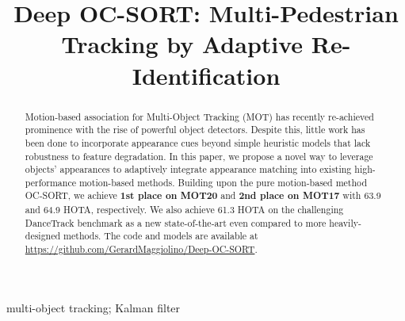 \documentclass{article}
\title{Deep OC-SORT: Multi-Pedestrian Tracking by Adaptive Re-Identification}
\begin{document}
\maketitle



\begin{abstract}
Motion-based association for Multi-Object Tracking (MOT) has recently re-achieved prominence with the rise of powerful object detectors. Despite this, little work has been done to incorporate appearance cues beyond simple heuristic models that lack robustness to feature degradation. In this paper, we propose a novel way to leverage objects' appearances to adaptively integrate appearance matching into existing high-performance motion-based methods. Building upon the pure motion-based method OC-SORT, we achieve \textbf{1st place on MOT20} and \textbf{2nd place on MOT17} with 63.9 and 64.9 HOTA, respectively. We also achieve 61.3 HOTA on the challenging DanceTrack benchmark as a new state-of-the-art even compared to more heavily-designed methods. The code and models are available at \url{https://github.com/GerardMaggiolino/Deep-OC-SORT}.
\end{abstract}
\begin{keywords}
multi-object tracking; Kalman filter
\end{keywords}
\end{document}
